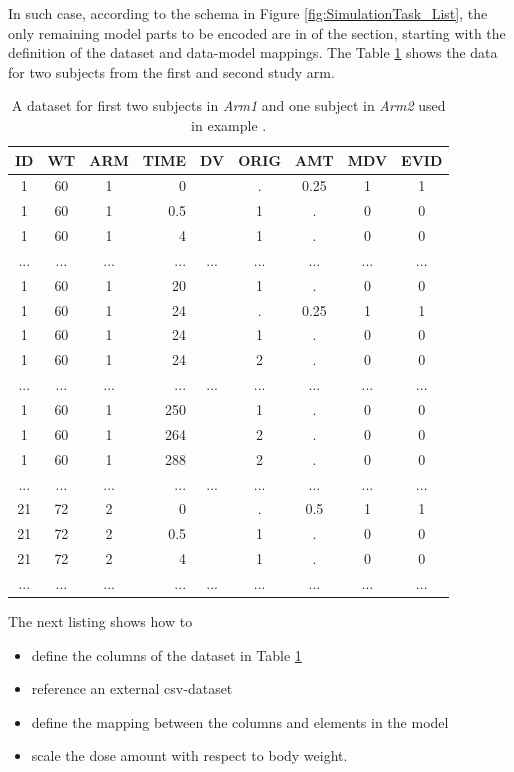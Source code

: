 In such case, according to the schema in Figure \ref{fig:SimulationTask_List},
the only remaining model parts to be encoded are in 
of the  section, starting with the definition of the 
dataset and data-model mappings. The Table \ref{tab:example1_dataSet} shows
the data for two subjects from the first and second study arm.
\begin{table}[htdp]
\begin{center}
\small
\renewcommand{\arraystretch}{1.1}%
\begin{tabular}{cccrccccc}\toprule
ID	& WT	& ARM	& TIME	& DV		& ORIG	& AMT	& MDV	& EVID \\\midrule
1	& 60		& 1		& 0		& 		& .		& 0.25	& 1		& 1 \\
1	& 60		& 1		& 0.5	& 		& 1		& .		& 0		& 0 \\
1	& 60		& 1		& 4		& 		& 1		& .		& 0		& 0 \\
... 	& ...		& ...		& ...		& ...		& ...		& ...		& ...		& ... \\
1	& 60		& 1		& 20		& 		& 1		& .		& 0		& 0 \\
1	& 60		& 1		& 24		& 		& .		& 0.25	& 1		& 1 \\
1	& 60		& 1		& 24		& 		& 1		& .		& 0		& 0 \\
1	& 60		& 1		& 24		&		& 2		& .		& 0		& 0 \\
... 	& ...		& ...		& ...		& ...		& ...		& ...		& ...		& ... \\
1	& 60		& 1		& 250	& 		& 1		& .		& 0		& 0 \\
1	& 60		& 1		& 264	& 		& 2		& .		& 0		& 0 \\
1	& 60		& 1		& 288	& 		& 2		& .		& 0		& 0 \\
... 	& ...		& ...		& ...		& ...		& ...		& ...		& ...		& ... \\
21	& 72		& 2		& 0		& 		& .		& 0.5	& 1		& 1 \\
21	& 72		& 2		& 0.5	& 		& 1		& .		& 0		& 0 \\
21	& 72		& 2		& 4		& 		& 1		& .		& 0		& 0 \\
...	& ...		& ...		& ...		& ...		&...		& ...		& ...		& ... \\ \bottomrule
\end{tabular}
\end{center}
\caption{A dataset for first two subjects in \emph{Arm1} and one subject in \emph{Arm2} 
used in example \theexamples.}
\label{tab:example1_dataSet}
\end{table}%
The next listing shows how to 
\begin{itemize}
\item
define the columns of the dataset in Table \ref{tab:example1_dataSet}
\item 
reference an external csv-dataset
\item
define the mapping between the columns and elements in the model
\item
scale the dose amount with respect to body weight.
\end{itemize}

